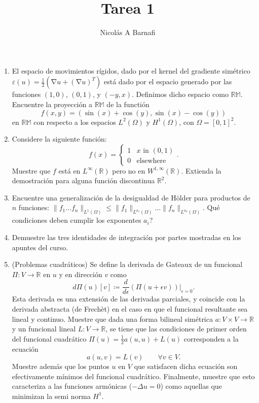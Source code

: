 \documentclass{article}
\title{Tarea 1}
\author{Nicol\'as A Barnafi}
\DeclareMathOperator{\grad}{\nabla}
\newcommand{\R}{\mathbb{R}}
\begin{document}
\maketitle

\begin{enumerate}
    \item El espacio de movimientos rígidos, dado por el kernel del gradiente simétrico $\varepsilon(u) = \frac 1 2 \left( \grad u + (\grad u)^T \right)$ está dado por el espacio generado por las funciones $(1,0)$, $(0,1)$, y $(-y, x)$. Definimos dicho espacio como $\mathbb{RM}$. Encuentre la proyección a $\mathbb{RM}$ de la functión 
        $$ f(x,y) = (\sin(x) + \cos(y), \sin(x) - \cos(y)) $$
    en $\mathbb{RM}$ con respecto a los espacios $L^2(\Omega)$ y $H^1(\Omega)$, con $\Omega=[0,1]^2$.
    \item Considere la siguiente función: 
        $$ f(x) = \begin{cases}
                        1 & \text{$x$ in $(0,1)$} \\
                        0 & \text{elsewhere}
                    \end{cases}. $$
    Muestre que $f$ está en $L^\infty(\R)$ pero no en $W^{1,\infty}(\R)$. Extienda la demostración para alguna función discontinua $\R^2$. 
    \item Encuentre una generalización de la desigualdad de Hölder para productos de $n$ funciones: $\| f_1 \hdots f_n \|_{L^1(\Omega)} \leq \| f_1\|_{L^{a_1}(\Omega)} \hdots \| f_n \|_{L^{a_n}(\Omega)}$. Qué condiciones deben cumplir los exponentes $a_i$? 
    \item Demuestre las tres identidades de integración por partes mostradas en los apuntes del curso.
    \item (Problemas cuadráticos) Se define la derivada de Gateaux de un funcional $\Pi: V \to \R$ en $u$ y en dirección $v$ como
        $$ d\Pi(u)[v] \coloneqq \frac{d}{d\epsilon}\left.\left(\Pi(u + \epsilon v) \right)\right|_{\epsilon=0}. $$
    Esta derivada es una extensión de las derivadas parciales, y coincide con la derivada abstracta (de Frechèt) en el caso en que el funcional resultante sea lineal y continuo. 
    Muestre que dada una forma bilineal simétrica $a: V\times V \to \R$ y un funcional lineal $L:V\to \R$, se tiene que las condiciones de primer orden del funcional cuadrático $\Pi(u) = \frac 1 2 a(u,u) + L(u)$ corresponden a la ecuación 
        $$ a(u,v) = L(v) \qquad\forall v \in V. $$
    Muestre además que los puntos $u$ en $V$ que satisfacen dicha ecuación son efectivamente mínimos del funcional cuadrático. Finalmente, muestre que esto caracteriza a las funciones armónicas ($-\Delta u=0$) como aquellas que minimizan la semi norma $H^1$. 

\end{enumerate}
\end{document}
